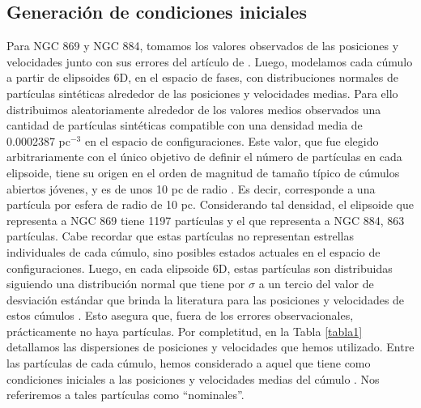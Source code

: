 \documentclass[baaa]{baaa}
\begin{document}
\subsection{Generación de condiciones iniciales} 
Para NGC 869 y NGC 884,  tomamos los valores observados de las posiciones y velocidades junto con sus errores del art\'iculo de \citet{Tarricq2021}. Luego, modelamos cada c\'umulo a partir de elipsoides 6D, en el espacio de fases, con distribuciones normales de partículas sintéticas alrededor de las posiciones y velocidades medias. Para ello distribuimos aleatoriamente alrededor de los valores medios observados  una cantidad de partículas sintéticas compatible con una densidad media de 0.0002387 pc$^{-3}$ en el espacio de configuraciones.  Este valor, que fue elegido arbitrariamente  con el \'unico objetivo de definir el n\'umero de part\'iculas en cada elipsoide, tiene su origen en el orden de magnitud de tama\~no t\'ipico de c\'umulos abiertos j\'ovenes, y es de unos 10 pc de radio \citep{Piskunov2007}. Es decir, corresponde a una part\'icula por esfera de radio de 10 pc. Considerando tal densidad, el elipsoide que representa a NGC 869 tiene 1197 partículas y el que representa a NGC 884, 863 partículas.  Cabe recordar que estas part\'iculas no representan estrellas individuales de cada c\'umulo, sino posibles estados actuales en el espacio de configuraciones.  Luego, en cada elipsoide 6D, estas part\'iculas son distribuidas siguiendo una distribución normal que tiene por $\sigma$ a un tercio del valor de desviaci\'on est\'andar que brinda la literatura para las posiciones y velocidades de estos c\'umulos \citep{Tarricq2021}. Esto asegura que, fuera de los errores observacionales, prácticamente no haya partículas. Por completitud, en la Tabla \ref{tabla1} detallamos las dispersiones de posiciones y velocidades que hemos utilizado. Entre las part\'iculas de cada c\'umulo, hemos considerado a aquel que tiene como condiciones iniciales a las posiciones y velocidades medias del c\'umulo \citep{Tarricq2021}. Nos referiremos a tales part\'iculas como “nominales”. 
\end{document}

